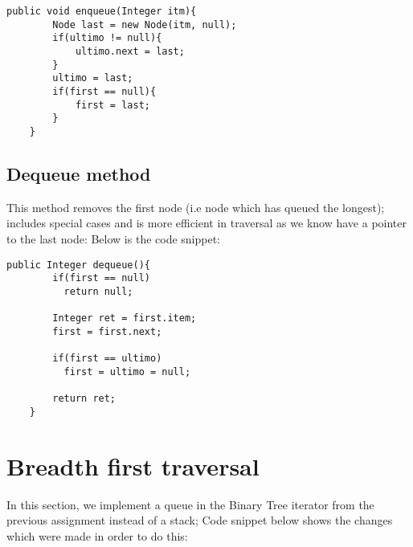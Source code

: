 \documentclass[a4paper,11pt]{article}
\begin{document}
\begin{verbatim}
public void enqueue(Integer itm){
        Node last = new Node(itm, null);
        if(ultimo != null){
            ultimo.next = last;
        }
        ultimo = last;
        if(first == null){
            first = last;
        } 
    }
\end{verbatim}


\subsection*{Dequeue method}

This method removes the first node (i.e node which has queued the longest); includes special cases and is more efficient in traversal as we know have a pointer to the last node: Below is the code snippet:

\begin{verbatim}
public Integer dequeue(){
        if(first == null)
          return null;
        
        Integer ret = first.item;
        first = first.next;
        
        if(first == ultimo)
          first = ultimo = null;
          
        return ret;
    }
\end{verbatim}



\section*{Breadth first traversal}
In this section, we implement a queue in the Binary Tree iterator from the previous assignment instead of a stack; Code snippet below shows the changes which were made in order to do this:
\end{document}
